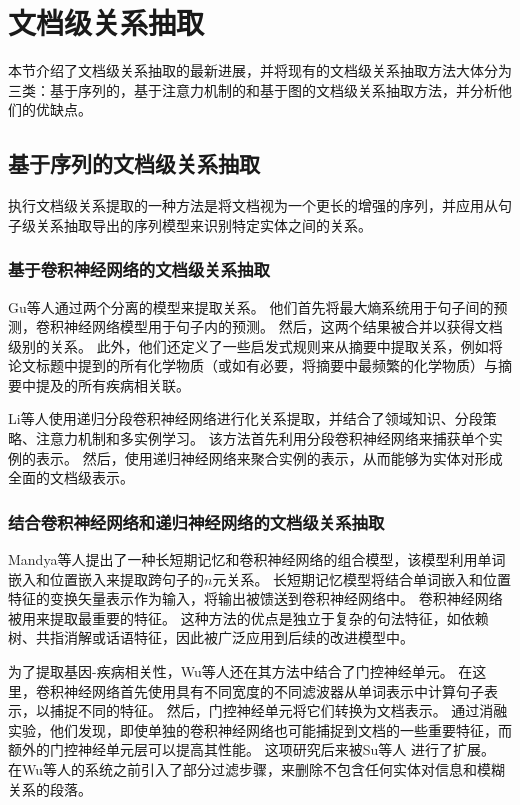 \documentclass[bachelor]{thesis-uestc}
\begin{document}
\section{文档级关系抽取}
本节介绍了文档级关系抽取的最新进展，并将现有的文档级关系抽取方法大体分为三类：基于序列的，基于注意力机制的和基于图的文档级关系抽取方法，并分析他们的优缺点。

\subsection{基于序列的文档级关系抽取}
执行文档级关系提取的一种方法是将文档视为一个更长的增强的序列，并应用从句子级关系抽取导出的序列模型来识别特定实体之间的关系。

\subsubsection{基于卷积神经网络的文档级关系抽取}
Gu等人通过两个分离的模型来提取关系。
他们首先将最大熵系统用于句子间的预测，卷积神经网络模型用于句子内的预测。
然后，这两个结果被合并以获得文档级别的关系。
此外，他们还定义了一些启发式规则来从摘要中提取关系，例如将论文标题中提到的所有化学物质（或如有必要，将摘要中最频繁的化学物质）与摘要中提及的所有疾病相关联。\par

Li等人使用递归分段卷积神经网络进行化关系提取，并结合了领域知识、分段策略、注意力机制和多实例学习。
该方法首先利用分段卷积神经网络来捕获单个实例的表示。
然后，使用递归神经网络来聚合实例的表示，从而能够为实体对形成全面的文档级表示。

\subsubsection{结合卷积神经网络和递归神经网络的文档级关系抽取}
Mandya等人提出了一种长短期记忆和卷积神经网络的组合模型，该模型利用单词嵌入和位置嵌入来提取跨句子的$n$元关系。
长短期记忆模型将结合单词嵌入和位置特征的变换矢量表示作为输入，将输出被馈送到卷积神经网络中。
卷积神经网络被用来提取最重要的特征。
这种方法的优点是独立于复杂的句法特征，如依赖树、共指消解或话语特征，因此被广泛应用到后续的改进模型中。

为了提取基因-疾病相关性，Wu等人还在其方法中结合了门控神经单元。
在这里，卷积神经网络首先使用具有不同宽度的不同滤波器从单词表示中计算句子表示，以捕捉不同的特征。
然后，门控神经单元将它们转换为文档表示。
通过消融实验，他们发现，即使单独的卷积神经网络也可能捕捉到文档的一些重要特征，而额外的门控神经单元层可以提高其性能。
这项研究后来被Su等人 进行了扩展。
在Wu等人的系统之前引入了部分过滤步骤，来删除不包含任何实体对信息和模糊关系的段落。
\end{document}
